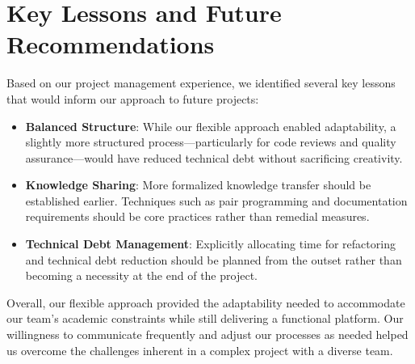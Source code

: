 \section{Key Lessons and Future Recommendations}

Based on our project management experience, we identified several key lessons that would inform our approach to future projects:

\begin{itemize}
    \item \textbf{Balanced Structure}: While our flexible approach enabled adaptability, a slightly more structured process—particularly for code reviews and quality assurance—would have reduced technical debt without sacrificing creativity.
    
    \item \textbf{Knowledge Sharing}: More formalized knowledge transfer should be established earlier. Techniques such as pair programming and documentation requirements should be core practices rather than remedial measures.
    
    \item \textbf{Technical Debt Management}: Explicitly allocating time for refactoring and technical debt reduction should be planned from the outset rather than becoming a necessity at the end of the project.
    
\end{itemize}

Overall, our flexible approach provided the adaptability needed to accommodate our team's academic constraints while still delivering a functional platform. Our willingness to communicate frequently and adjust our processes as needed helped us overcome the challenges inherent in a complex project with a diverse team.